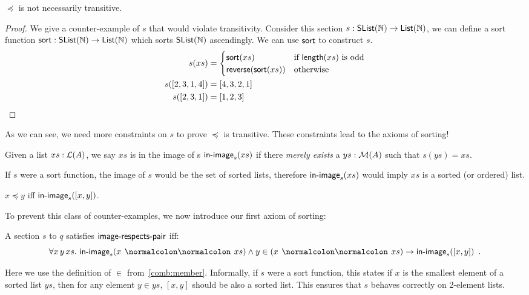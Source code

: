 \begin{proposition}
    $\preccurlyeq$ is not necessarily transitive.
\end{proposition}
\begin{proof}
    We give a counter-example of $s$ that would violate transitivity.
    Consider this section $s : \operatorname{\mathsf{SList}}(\mathbb{N}) \to \operatorname{\mathsf{List}}(\mathbb{N})$, we can define a sort function
    $\operatorname{\mathsf{sort}} : \operatorname{\mathsf{SList}}(\mathbb{N}) \to \operatorname{\mathsf{List}}(\mathbb{N})$ which sorts $\operatorname{\mathsf{SList}}(\mathbb{N})$ ascendingly. We can use $\operatorname{\mathsf{sort}}$
    to construct $s$.
    \begin{align*}
        s(xs)        & = \begin{cases}
                             \operatorname{\mathsf{sort}}(xs)                 & \text{if $\operatorname{\mathsf{length}}(xs)$ is odd} \\
                             \operatorname{\mathsf{reverse}}(\operatorname{\mathsf{sort}}(xs)) & \text{otherwise}
                         \end{cases} \\
        s([2,3,1,4]) & = [4,3,2,1]                                                                     \\
        s([2,3,1])   & = [1,2,3]
    \end{align*}
\end{proof}
As we can see, we need more constraints on $s$ to prove $\preccurlyeq$ is transitive.
These constraints lead to the axioms of sorting!
\begin{definition}
    Given a list $xs : \mathcal{L}(A)$, we say $xs$ is in the image of s $\operatorname{\mathsf{in-image}}_s(xs)$ if there \emph{merely exists}
    a $ys : \mathcal{M}(A)$ such that $s(ys) = xs$.
\end{definition}

If $s$ were a sort function, the image of $s$ would be the set of sorted lists, therefore
$\operatorname{\mathsf{in-image}}_s(xs)$ would imply $xs$ is a sorted (or ordered) list.

\begin{proposition}\label{sort:sort-to-order}
    $x \preccurlyeq y$ \; iff \; $\operatorname{\mathsf{in-image}}_s([x, y])$.
\end{proposition}

\noindent
To prevent this class of counter-examples, we now introduce our first axiom of sorting:
\begin{definition}\label{sort:head-least}
    A section $s$ to $q$ satisfies $\operatorname{\mathsf{image-respects-pair}}$ iff:
    \[
        \forall x\, y\, xs.\, \issorted(x \cons xs) \land y \in (x \cons xs) \to \issorted([x,y])
        \enspace .
    \]
\end{definition}
Here we use the definition of $\in$ from~\cref{comb:member}. Informally,
if $s$ were a sort function, this states if
$x$ is the smallest element of a sorted list $ys$, then for any element $y \in ys$,
$[x, y]$ should be also a sorted list.
%
This ensures that $s$ behaves correctly on 2-element lists.

